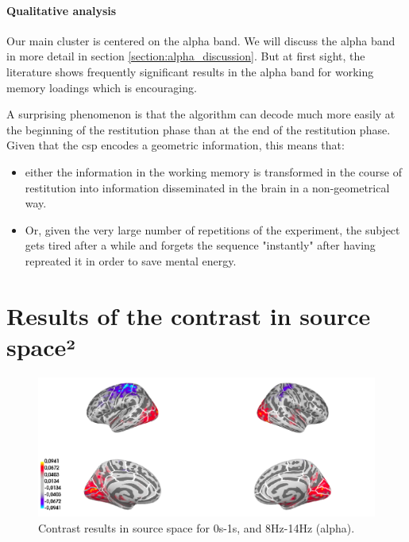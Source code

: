 \paragraph{Qualitative analysis}

Our main cluster is centered on the alpha band. We will discuss the alpha band in more detail in section \ref{section:alpha_discussion}. But at first sight, the literature shows frequently significant results in the alpha band for working memory loadings \cite{obleser2012adverse} which is encouraging.

A surprising phenomenon is that the algorithm can decode much more easily at the beginning of the restitution phase than at the end of the restitution phase. Given that the csp encodes a geometric information, this means that:
\begin{itemize}
    \item either the information in the working memory is transformed in the course of restitution into information disseminated in the brain in a non-geometrical way.
    \item Or, given the very large number of repetitions of the experiment, the subject gets tired after a while and forgets the sequence "instantly" after having repreated it in order to save mental energy.
\end{itemize}



\section{Results of the contrast in source space²}


\begin{figure}[ht]
    \centering
    \includegraphics[width=15cm]{images_report/source/source_results_3d_cropped.png}
    \caption[Contrast results in the source space (alpha)]%
    {Contrast results in source space for 0s-1s, and 8Hz-14Hz (alpha).}
    \label{results_source_space_alpha}
\end{figure}

